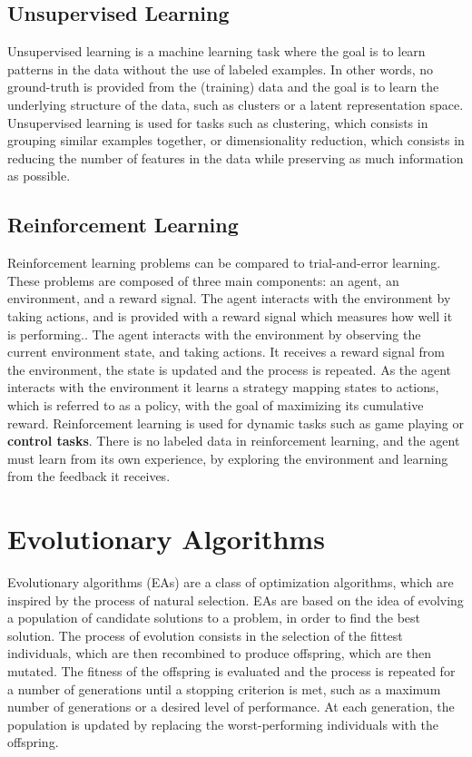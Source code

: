\subsection{Unsupervised Learning}

Unsupervised learning is a machine learning task where the goal is to learn patterns in the data without the use of labeled examples.
In other words, no ground-truth is provided from the (training) data and the goal is to learn the underlying structure of the data, such as clusters or a latent
representation space. Unsupervised learning is used for tasks such as clustering, which consists in grouping similar examples together, or dimensionality reduction,
which consists in reducing the number of features in the data while preserving as much information as possible.

\subsection{Reinforcement Learning}

Reinforcement learning problems can be compared to trial-and-error learning. These problems are composed of three main components: an agent, an environment, and a reward
signal. The agent interacts with the environment by taking actions, and is provided with a reward signal which measures how well it is performing.. The agent interacts with
the environment by observing the current environment state, and taking actions. It receives a reward signal from the environment, the state is updated and the process is repeated.
As the agent interacts with the environment it learns a strategy mapping states to actions, which is referred to as a policy, with the goal of maximizing its cumulative reward.
Reinforcement learning is used for dynamic tasks such as game playing or \textbf{control tasks}.
There is no labeled data in reinforcement learning, and the agent must learn from its own experience, by exploring the environment and learning from the feedback it receives.

\section{Evolutionary Algorithms}

Evolutionary algorithms (EAs) are a class of optimization algorithms, which are inspired by the process of natural selection. EAs are based on the idea of
evolving a population of candidate solutions to a problem, in order to find the best solution. The process of evolution consists in the selection of the
fittest individuals, which are then recombined to produce offspring, which are then mutated. The fitness of the offspring is evaluated and the process is
repeated for a number of generations until a stopping criterion is met, such as a maximum number of generations or a desired level of performance.
At each generation, the population is updated by replacing the worst-performing individuals with the offspring.


